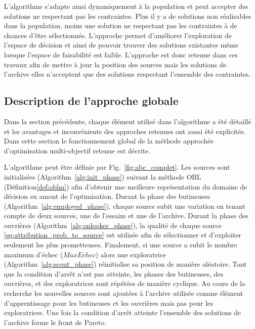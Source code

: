 L’algorithme s’adapte ainsi dynamiquement à la population et peut accepter des
solutions ne respectant pas les contraintes. Plus il y a de solutions non
réalisables dans la population, moins une solution ne respectant pas les contraintes à
de chances d’être sélectionnée. L’approche permet d’améliorer l’exploration de
l’espace de décision et ainsi de pouvoir trouver des solutions existantes même
lorsque l’espace de faisabilité est faible.
L’approche est donc retenue dans ces travaux afin de mettre à jour la position des
sources mais les solutions de l’archive elles n’acceptent que des solutions respectant
l’ensemble des contraintes.


\subsection{Description de l’approche globale} %
\label{sub:description_de_l_approche_globale}
Dans la section précédente, chaque élément utilisé dans l’algorithme a été détaillé et
les avantages et inconvénients des approches retenues ont aussi été explicités.
Dans cette section le fonctionnement global de la méthode approchée d’optimisation
multi-objectif retenue est décrite.

L’algorithme peut être définie par Fig.~\ref{fig:abc_complet}.
Les sources sont initialisées (Algorithm~\ref{alg:init_phase}) suivant la méthode
OBL (Définition\ref{def:oblm}) afin d’obtenir une meilleure représentation du
domaine de décision en amont de l’optimisation.
Durant la phase des butineuses (Algorithm~\ref{alg:employed_phase}), chaque source
subit une variation en tenant compte de deux sources, une de l’essaim et une de l’archive.
Durant la phase des ouvrières (Algorithm~\ref{alg:onlooker_phase}), la qualité de
chaque source \eqref{eq:attribution_prob_to_source} est utilisée afin de sélectionner
et d’exploiter seulement les plus prometteuses. Finalement, si une source a subit le
nombre maximum d’échec ($MaxEchec$) alors une exploratrice (Algorithm~\ref{alg:scout_phase})
réinitialise sa position de manière aléatoire.
Tant que la condition d’arrêt n’est pas atteinte, les phases des butineuses,
des ouvrières, et des exploratrices sont répétées de manière cyclique. Au cours de
la recherche les nouvelles sources sont ajoutées à l’archive utilisée
comme élément d’apprentissage pour les butineuses et les ouvrières mais pas pour les
exploratrices. Une fois la condition d’arrêt atteinte l’ensemble des solutions
de l’archive forme le front de Pareto.

